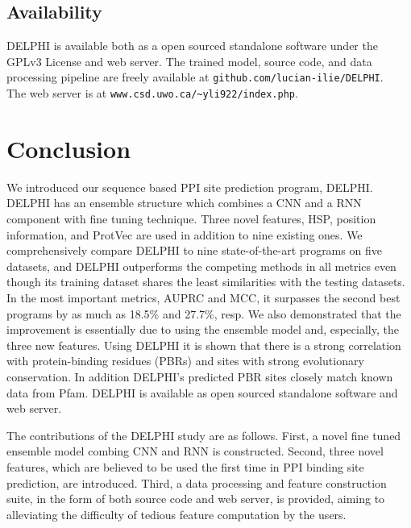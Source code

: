 \subsection{Availability}
DELPHI is available both as a open sourced standalone software under the GPLv3 License and web server. The trained model, source code, and data processing pipeline are freely available at \texttt{github.com/lucian-ilie/DELPHI}.\\The web server is at \texttt{www.csd.uwo.ca/\textasciitilde{}yli922/index.php}.
\section{Conclusion}
We introduced our sequence based PPI site prediction program, DELPHI. DELPHI has an ensemble structure which combines a CNN and a RNN component with fine tuning technique. Three novel features, HSP, position information, and ProtVec are used in addition to nine existing ones. We comprehensively compare DELPHI to nine state-of-the-art programs on five datasets, and DELPHI outperforms the competing methods in all metrics even though its training dataset shares the least similarities with the testing datasets. In the most important metrics, AUPRC and MCC, it surpasses the second best programs by as much as 18.5\% and 27.7\%, resp. We also demonstrated that the improvement is essentially due to using the ensemble model and, especially, the three new features. Using DELPHI it is shown that there is a strong correlation with protein-binding residues (PBRs) and sites with strong evolutionary conservation.  In addition DELPHI's predicted PBR sites closely match known data from Pfam.
DELPHI is available as open sourced standalone software and web server.

The contributions of the DELPHI study are as follows. First, a novel fine tuned ensemble model combing CNN and RNN is constructed. Second, three novel features, which are believed to be used the first time in PPI binding site prediction, are introduced. Third, a data processing and feature construction suite, in the form of both source code and web server, is provided, aiming to alleviating the difficulty of tedious feature computation by the users.